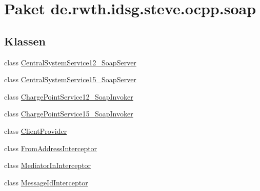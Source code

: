 \hypertarget{namespacede_1_1rwth_1_1idsg_1_1steve_1_1ocpp_1_1soap}{\section{Paket de.\-rwth.\-idsg.\-steve.\-ocpp.\-soap}
\label{namespacede_1_1rwth_1_1idsg_1_1steve_1_1ocpp_1_1soap}
}
\subsection*{Klassen}
\begin{DoxyCompactItemize}
\item 
class \hyperlink{classde_1_1rwth_1_1idsg_1_1steve_1_1ocpp_1_1soap_1_1_central_system_service12___soap_server}{Central\-System\-Service12\-\_\-\-Soap\-Server}
\item 
class \hyperlink{classde_1_1rwth_1_1idsg_1_1steve_1_1ocpp_1_1soap_1_1_central_system_service15___soap_server}{Central\-System\-Service15\-\_\-\-Soap\-Server}
\item 
class \hyperlink{classde_1_1rwth_1_1idsg_1_1steve_1_1ocpp_1_1soap_1_1_charge_point_service12___soap_invoker}{Charge\-Point\-Service12\-\_\-\-Soap\-Invoker}
\item 
class \hyperlink{classde_1_1rwth_1_1idsg_1_1steve_1_1ocpp_1_1soap_1_1_charge_point_service15___soap_invoker}{Charge\-Point\-Service15\-\_\-\-Soap\-Invoker}
\item 
class \hyperlink{classde_1_1rwth_1_1idsg_1_1steve_1_1ocpp_1_1soap_1_1_client_provider}{Client\-Provider}
\item 
class \hyperlink{classde_1_1rwth_1_1idsg_1_1steve_1_1ocpp_1_1soap_1_1_from_address_interceptor}{From\-Address\-Interceptor}
\item 
class \hyperlink{classde_1_1rwth_1_1idsg_1_1steve_1_1ocpp_1_1soap_1_1_mediator_in_interceptor}{Mediator\-In\-Interceptor}
\item 
class \hyperlink{classde_1_1rwth_1_1idsg_1_1steve_1_1ocpp_1_1soap_1_1_message_id_interceptor}{Message\-Id\-Interceptor}
\end{DoxyCompactItemize}
